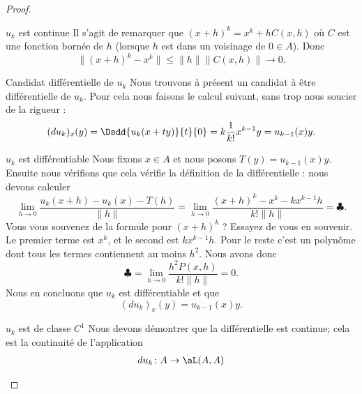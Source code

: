 \begin{proof}
\begin{subproof}
        \item[\( u_k\) est continue]
            Il s'agit de remarquer que \( (x+h)^k=x^k+hC(x,h)\) où \( C\) est une fonction bornée de \( h\) (lorsque \( h\) est dans un voisinage de \( 0\in A\)). Donc
            \begin{equation}
                \| (x+h)^k-x^k \|\leq \| h \|\| C(x,h) \|\to 0.
            \end{equation}
        \item[Candidat différentielle de \( u_k\)]
            Nous trouvons à présent un candidat à être différentielle de \( u_k\). Pour cela nous faisons le calcul suivant, sans trop nous soucier de la rigueur :
            \begin{equation}
                (du_k)_x(y)=\Dsdd{ u_k(x+ty) }{t}{0}=k\frac{1}{ k! }x^{k-1}y=u_{k-1}(x)y.
            \end{equation}
        \item[\( u_k\) est différentiable] 
            Nous fixons \( x\in A\) et nous posons \( T(y)=u_{k-1}(x)y\). Ensuite nous vérifions que cela vérifie la définition de la différentielle : nous devons calculer
            \begin{equation}        \label{EQooNPKGooVmEYAV}
                \lim_{h\to 0} \frac{ u_k(x+h)-u_k(x)-T(h) }{ \| h \| }=\lim_{h\to 0} \frac{ (x+h)^k-x^k-kx^{k-1}h }{ k! \| h \| }=\clubsuit.
            \end{equation}
            Vous vous souvenez de la formule pour \( (x+h)^k\) ? Essayez de vous en souvenir. Le premier terme est \( x^k\), et le second est \( kx^{k-1}h\). Pour le reste c'est un polynôme dont tous les termes contiennent au moins \( h^2\). Nous avons donc
            \begin{equation}
                \clubsuit=\lim_{h\to 0} \frac{ h^2P(x,h) }{ k!\| h \| }=0.
            \end{equation}
            Nous en concluons que \( u_k\) est différentiable et que
            \begin{equation}
                (du_k)_x(y)=u_{k-1}(x)y.
            \end{equation}
        \item[\( u_k\) est de classe \( C^1\)]
            Nous devons démontrer que la différentielle est continue; cela est la continuité de l'application
            \begin{equation}
                \begin{aligned}
                    du_k\colon A&\to \aL(A,A) \\

\end{aligned}
\end{equation}
\end{subproof}
\end{proof}
